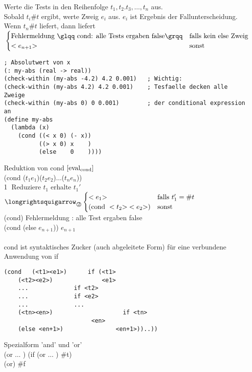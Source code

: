 Werte die Tests in den Reihenfolge $t_1,t_2.t_3,\ldots,t_n$ aus.\\
Sobald $t_i \#t$ ergibt, werte Zweig $e_i$ aus. $e_i$ ist Ergebnis der Fallunterscheidung. Wenn $t_n \#t$ liefert, dann liefert $\\
\begin{cases}
\t{Fehlermeldung \glqq cond: alle Tests ergaben false\grqq}& \t{falls kein else Zweig}\\
<e_{n+1}\t{\zu}& \t{sonst}
\end{cases}$
\bigskip\\
\begin{lstlisting}[frame=listing]
; Absolutwert von x
(: my-abs (real -> real))
(check-within (my-abs -4.2) 4.2 0.001)   ; Wichtig:
(check-within (my-abs 4.2) 4.2 0.001)    ; Tesfaelle decken alle Zweige
(check-within (my-abs 0) 0 0.001)        ; der conditional expression an
(define my-abs
  (lambda (x)
    (cond ((< x 0) (- x))
          ((> x 0) x    )
          (else    0    ))))
\end{lstlisting}
Reduktion von cond $\lbrack \text{eval}_{\text{cond}}\rbrack $\\
(cond (\auf $t_1$\zu \auf $e_1$\zu)(\auf $t_2$\zu \auf $e_2$\zu)$\ldots$(\auf $t_n$\zu \auf $e_n$\zu))\\
\textcircled{1} Reduziere $t_1$ erhalte $t_1'$ $\t{\eval}_{\t{\textcircled{2}}} \begin{cases}
<e_1\t{\zu} & \t{falls }t_1' = \#t\\
(\t{cond }<t_2\t{\zu} <e_2\t{\zu}) & \t{sonst}
\end{cases}$\\
(cond) \eval \glqq Fehlermeldung : alle Test ergaben false \grqq\\
(cond (else \auf $e_{n+1}$)) \eval $e_{n+1}$\\
\bigskip\\
cond ist syntaktisches Zucker (auch abgeleitete Form) für eine verbundene Anwendung von if \\
\begin{lstlisting}
(cond 	(<t1><e1>) 		if (<t1>
	(<t2><e2>)	    	    <e1>
	...				if <t2>
	...				if <e2>
	...				...
	(<tn><en>)       	    	  if <tn>
					     <en>
	(else <en+1>)  	 			<en+1>))..))
\end{lstlisting}
Spezialform 'and' und 'or' \\
(or   $\ldots$ ) \eval (if  (or  $\ldots$ ) \#t)\\
(or) \eval \#f \\
